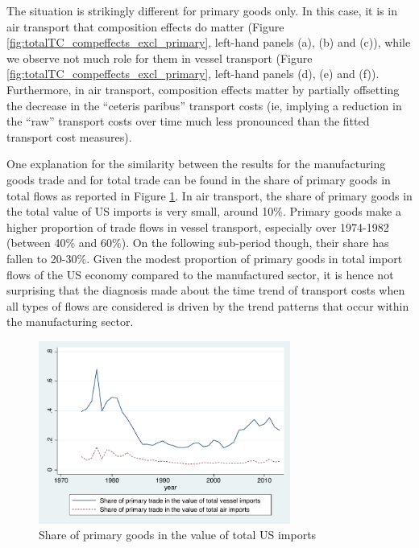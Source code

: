\documentclass[11pt,twoside, authoryear]{elsarticle}
\begin{document}
The situation is strikingly different for primary goods only. In this case, it is in air transport that composition effects do matter (Figure \ref{fig:totalTC_compeffects_excl_primary}, left-hand panels (a), (b) and (c)), while we observe not much role for them in vessel transport (Figure \ref{fig:totalTC_compeffects_excl_primary}, left-hand panels (d), (e) and (f)). Furthermore, in air transport, composition effects matter by partially offsetting the decrease in the ``ceteris paribus'' transport costs (ie, implying a reduction in the ``raw'' transport costs over time much less pronounced than the fitted transport cost measures).

One explanation for the similarity between the results for the manufacturing goods trade and for total trade can be found in the share of primary goods in total flows as reported in Figure \ref{fig:Share_prim_goods}. In air transport, the share of primary goods in the total value of US imports is very small, around 10\%. Primary goods make a higher proportion of trade flows in vessel transport, especially over 1974-1982 (between 40\% and 60\%). On the following sub-period though, their share has fallen to 20-30\%. Given the modest proportion of primary goods in total import flows of the US economy compared to the manufactured sector, it is hence not surprising that the diagnosis made about the time trend of transport costs when all types of flows are considered is driven by the trend patterns that occur within the manufacturing sector.

\begin{figure}[htbp]
\caption{Share of primary goods in the value of total US imports}
\label{fig:Share_prim_goods}
\begin{center}
\includegraphics[height=6cm]
{Share_of_primary.pdf}
\end{center}
\end{figure}
\end{document}
